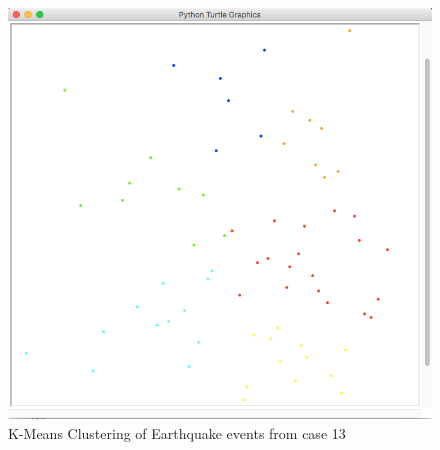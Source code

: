 \begin{figure}[!h]
\centering
\includegraphics[scale=0.6]{clusters-nobg.png}
\caption{K-Means Clustering of Earthquake events from case 13}
\label{fig:clusters}
\end{figure}